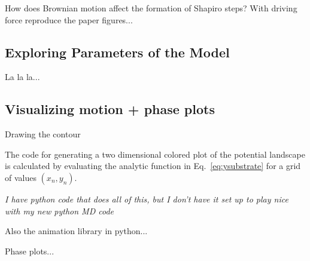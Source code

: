 \documentclass[twocolumn,preprintnumbers,amsmath,amssymb,aps,prx]{revtex4}
\begin{document}
  How does Brownian motion affect
  the formation of Shapiro steps?
  With driving force reproduce the paper figures...

  \subsection{Exploring Parameters of the Model}
  \label{ex:parameters}

  La la la...
  


  \subsection{Visualizing motion + phase plots}
  \label{ex:animation}
  
  Drawing the contour 

  The code for generating
  a two dimensional colored plot
  of the potential landscape
  is calculated by evaluating
  the analytic function in Eq.~\ref{eq:ysubstrate}
  for a grid of values $(x_n,y_n)$.

  {\it I have python code that does all of this, but I don't have it
    set up to play nice with my new python MD code}
  
  Also the animation library in python...

  Phase plots...
    
\end{document}
